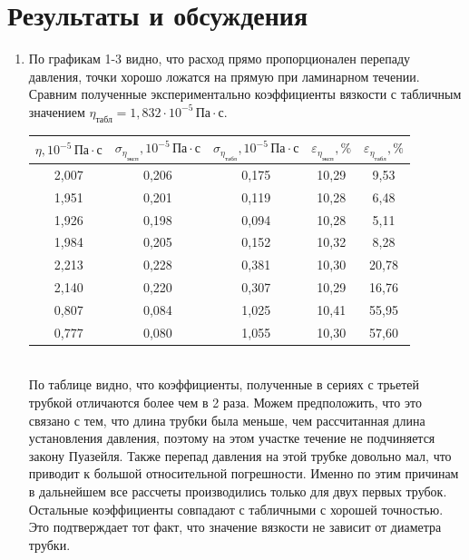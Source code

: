 \documentclass[a4paper]{article}
\begin{document}
\section{Результаты и обсуждения}
\begin{enumerate}
\item По графикам 1-3 видно, что расход прямо пропорционален перепаду давления, точки хорошо ложатся на прямую при ламинарном течении. Сравним полученные экспериментально коэффициенты вязкости с табличным значением $\eta_{\text{табл}} = 1,832 \cdot 10^{-5} \, \text{Па} \cdot \text{с}$.
\begin{table}[h!]
    \centering
    \begin{tabular}{|c|c|c|c|c|}
        \hline
        $\eta, 10^{-5} \, \text{Па} \cdot \text{с}$ & $\sigma_{\eta_{\text{эксп}}}, 10^{-5} \, \text{Па} \cdot \text{с}$ & $\sigma_{\eta_{\text{табл}}}, 10^{-5} \, \text{Па} \cdot \text{с}$ & $\varepsilon_{\eta_{\text{эксп}}}, \%$ & $\varepsilon_{\eta_{\text{табл}}}, \%$ \\
        \hline
        2,007 & 0,206 & 0,175 & 10,29 & 9,53 \\ \hline
        1,951 & 0,201 & 0,119 & 10,28 & 6,48 \\ \hline
        1,926 & 0,198 & 0,094 & 10,28 & 5,11 \\ \hline
        1,984 & 0,205 & 0,152 & 10,32 & 8,28 \\ \hline
        2,213 & 0,228 & 0,381 & 10,30 & 20,78 \\ \hline
        2,140 & 0,220 & 0,307 & 10,29 & 16,76 \\ \hline
        0,807 & 0,084 & 1,025 & 10,41 & 55,95 \\ \hline
        0,777 & 0,080 & 1,055 & 10,30 & 57,60 \\ \hline
    \end{tabular}
\end{table}
\\
По таблице видно, что коэффициенты, полученные в сериях с трьетей трубкой отличаются более чем в 2 раза. Можем предположить, что это связано с тем, что длина трубки была меньше, чем рассчитанная длина установления давления, поэтому на этом участке течение не подчиняется закону Пуазейля. Также перепад давления на этой трубке довольно мал, что приводит к большой относительной погрешности. Именно по этим причинам в дальнейшем все рассчеты производились только для двух первых трубок. Остальные коэффициенты совпадают с табличными с хорошей точностью. Это подтверждает тот факт, что значение вязкости не зависит от диаметра трубки.

\end{enumerate}
\end{document}
